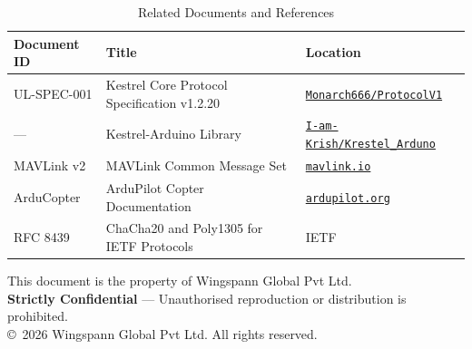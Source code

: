 \documentclass[11pt,a4paper]{article}
\begin{document}
\begin{table}[H]
    \centering
    \begin{tabularx}{\textwidth}{@{}llX@{}}
        \toprule
        \textbf{Document ID} & \textbf{Title} & \textbf{Location} \\
        \midrule
        UL-SPEC-001 &
            Kestrel Core Protocol Specification v1.2.20 &
            \href{https://github.com/Monarch666/ProtocolV1}
                 {\texttt{Monarch666/ProtocolV1}} \\
        --- &
            Kestrel-Arduino Library &
            \href{https://github.com/I-am-Krish/Krestel_Arduno}
                 {\texttt{I-am-Krish/Krestel\_Arduno}} \\
        MAVLink v2 &
            MAVLink Common Message Set &
            \href{https://mavlink.io/en/messages/common.html}
                 {\texttt{mavlink.io}} \\
        ArduCopter &
            ArduPilot Copter Documentation &
            \href{https://ardupilot.org/copter/}
                 {\texttt{ardupilot.org}} \\
        RFC 8439 &
            ChaCha20 and Poly1305 for IETF Protocols &
            IETF \\
        \bottomrule
    \end{tabularx}
    \caption{Related Documents and References}
\end{table}

\vfill
\begin{center}
    \textcolor{codegray}{\small
        This document is the property of Wingspann Global Pvt Ltd.\\
        \textcolor{alertred}{\textbf{Strictly Confidential}} ---
        Unauthorised reproduction or distribution is prohibited.\\
        \copyright\ 2026 Wingspann Global Pvt Ltd. All rights reserved.
    }
\end{center}
\end{document}
